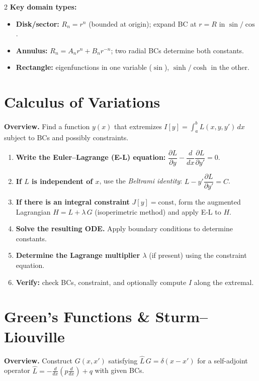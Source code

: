 \documentclass[a4paper,9pt]{article}
\begin{document}
\begin{multicols}{2}
\textbf{Key domain types:}
\begin{itemize}
\item \textbf{Disk/sector:} $R_n = r^n$ (bounded at origin); expand BC at $r=R$ in $\sin/\cos$.
\item \textbf{Annulus:} $R_n = A_n r^n + B_n r^{-n}$; two radial BCs determine both constants.
\item \textbf{Rectangle:} eigenfunctions in one variable ($\sin$), $\sinh/\cosh$ in the other.
\end{itemize}

\section{Calculus of Variations}

\textbf{Overview.} Find a function $y(x)$ that extremizes $I[y]=\int_a^b L(x,y,y')\,dx$ subject to BCs and possibly constraints.

\begin{enumerate}
\item \textbf{Write the Euler--Lagrange (E-L) equation:}
$\dfrac{\partial L}{\partial y} - \dfrac{d}{dx}\dfrac{\partial L}{\partial y'} = 0.$
\item \textbf{If $L$ is independent of $x$}, use the \emph{Beltrami identity}: $L - y'\dfrac{\partial L}{\partial y'} = C$.
\item \textbf{If there is an integral constraint} $J[y]=\text{const}$, form the augmented Lagrangian $H = L + \lambda\, G$ (isoperimetric method) and apply E-L to $H$.
\item \textbf{Solve the resulting ODE.} Apply boundary conditions to determine constants.
\item \textbf{Determine the Lagrange multiplier $\lambda$} (if present) using the constraint equation.
\item \textbf{Verify:} check BCs, constraint, and optionally compute $I$ along the extremal.
\end{enumerate}

\section{Green's Functions \& Sturm--Liouville}

\textbf{Overview.} Construct $G(x,x')$ satisfying $\hat{L}\,G = \delta(x-x')$ for a self-adjoint operator $\hat{L} = -\frac{d}{dx}(p\frac{d}{dx})+q$ with given BCs.


\end{multicols}
\end{document}
